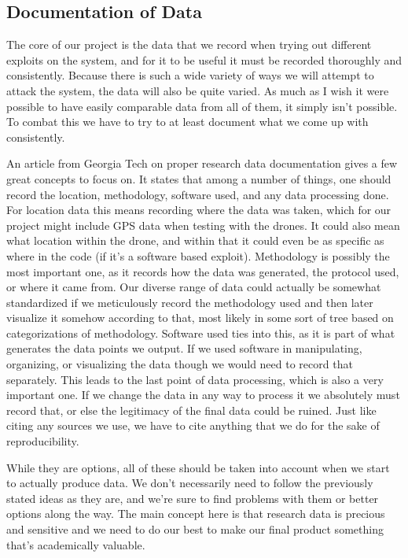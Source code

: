 \documentclass[IEEEtran,letterpaper,10pt,notitlepage,draftclsnofoot,onecolumn]{article}
\begin{document}
\subsection{Documentation of Data}
The core of our project is the data that we record when trying out different exploits on the system, and for it to be useful it must be recorded thoroughly and consistently. 
Because there is such a wide variety of ways we will attempt to attack the system, the data will also be quite varied. 
As much as I wish it were possible to have easily comparable data from all of them, it simply isn't possible. 
To combat this we have to try to at least document what we come up with consistently.

An article from Georgia Tech on proper research data documentation gives a few great concepts to focus on. \cite{GTDD}
It states that among a number of things, one should record the location, methodology, software used, and any data processing done. 
For location data this means recording where the data was taken, which for our project might include GPS data when testing with the drones. 
It could also mean what location within the drone, and within that it could even be as specific as where in the code (if it's a software based exploit).
Methodology is possibly the most important one, as it records how the data was generated, the protocol used, or where it came from.
Our diverse range of data could actually be somewhat standardized if we meticulously record the methodology used and then later visualize it somehow according to that, most likely in some sort of tree based on categorizations of methodology. 
Software used ties into this, as it is part of what generates the data points we output. 
If we used software in manipulating, organizing, or visualizing the data though we would need to record that separately. 
This leads to the last point of data processing, which is also a very important one.
If we change the data in any way to process it we absolutely must record that, or else the legitimacy of the final data could be ruined.
Just like citing any sources we use, we have to cite anything that we do for the sake of reproducibility.

While they are options, all of these should be taken into account when we start to actually produce data. 
We don't necessarily need to follow the previously stated ideas as they are, and we're sure to find problems with them or better options along the way.
The main concept here is that research data is precious and sensitive and we need to do our best to make our final product something that's academically valuable.
\end{document}
